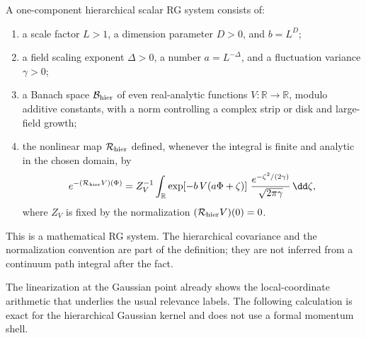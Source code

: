 \begin{definition}
\label{def:hierarchical-scalar-rg-system}
A one-component hierarchical scalar RG system consists of:
\begin{enumerate}
  \item a scale factor \(L>1\), a dimension parameter \(D>0\), and
  \(b=L^D\);
  \item a field scaling exponent \(\Delta>0\), a number
  \(a=L^{-\Delta}\), and a fluctuation variance \(\gamma>0\);
  \item a Banach space \(\mathcal B_{\rm hier}\) of even real-analytic
  functions \(V:\mathbb R\to\mathbb R\), modulo additive constants, with a
  norm controlling a complex strip or disk and large-field growth;
  \item the nonlinear map \(\mathcal R_{\rm hier}\) defined, whenever the
  integral is finite and analytic in the chosen domain, by
  \begin{equation}
    e^{-(\mathcal R_{\rm hier}V)(\Phi)}
    =
    Z_V^{-1}
    \int_{\mathbb R}
      \exp\!\left[-b\,V(a\Phi+\zeta)\right]\,
      \frac{e^{-\zeta^2/(2\gamma)}}{\sqrt{2\pi\gamma}}\,\dd\zeta ,
    \label{eq:hierarchical-scalar-rg-map}
  \end{equation}
  where \(Z_V\) is fixed by the normalization
  \((\mathcal R_{\rm hier}V)(0)=0\).
\end{enumerate}
This is a mathematical RG system.  The hierarchical covariance and the
normalization convention are part of the definition; they are not inferred
from a continuum path integral after the fact.
\end{definition}

The linearization at the Gaussian point already shows the local-coordinate
arithmetic that underlies the usual relevance labels.  The following
calculation is exact for the hierarchical Gaussian kernel and does not use a
formal momentum shell.

